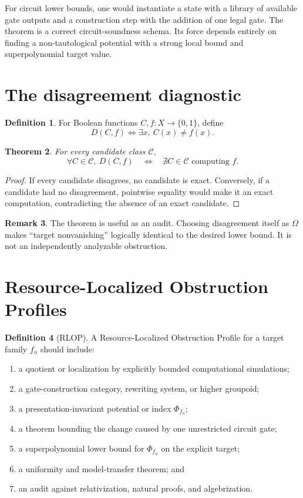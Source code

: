 \documentclass[11pt]{article}
\newtheorem{theorem}{Theorem}[section]
\theoremstyle{definition}
\newtheorem{definition}[theorem]{Definition}
\newtheorem{remark}[theorem]{Remark}
\begin{document}
For circuit lower bounds, one would instantiate a state with a library of
available gate outputs and a construction step with the addition of one legal
gate.  The theorem is a correct circuit-soundness schema.  Its force depends
entirely on finding a non-tautological potential with a strong local bound and
superpolynomial target value.

\section{The disagreement diagnostic}

\begin{definition}
For Boolean functions \(C,f:X\to\{0,1\}\), define
\[
  D(C,f)\iff \exists x,\ C(x)\ne f(x).
\]
\end{definition}

\begin{theorem}
For every candidate class \(\mathcal C\),
\[
  \forall C\in\mathcal C,\ D(C,f)
  \quad\Longleftrightarrow\quad
  \nexists C\in\mathcal C\text{ computing }f.
\]
\end{theorem}

\begin{proof}
If every candidate disagrees, no candidate is exact.  Conversely, if a
candidate had no disagreement, pointwise equality would make it an exact
computation, contradicting the absence of an exact candidate.
\end{proof}

\begin{remark}
The theorem is useful as an audit.  Choosing disagreement itself as
\(\Omega\) makes ``target nonvanishing'' logically identical to the desired
lower bound.  It is not an independently analyzable obstruction.
\end{remark}

\section{Resource-Localized Obstruction Profiles}

\begin{definition}[RLOP]
A Resource-Localized Obstruction Profile for a target family \(f_n\) should
include:
\begin{enumerate}[leftmargin=*]
\item a quotient or localization by explicitly bounded computational
simulations;
\item a gate-construction category, rewriting system, or higher groupoid;
\item a presentation-invariant potential or index \(\Phi_{f_n}\);
\item a theorem bounding the change caused by one unrestricted circuit gate;
\item a superpolynomial lower bound for \(\Phi_{f_n}\) on the explicit target;
\item a uniformity and model-transfer theorem; and
\item an audit against relativization, natural proofs, and algebrization.
\end{enumerate}
\end{definition}
\end{document}
